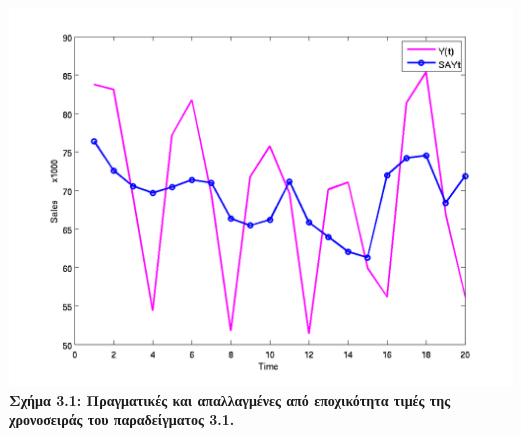 \begin{center}
\includegraphics[scale=0.7]{graff3.png}\\   
\textbf{Σχήμα 3.1: Πραγματικές και απαλλαγμένες από εποχικότητα τιμές της χρονοσειράς του παραδείγματος 3.1.}
\end{center}

